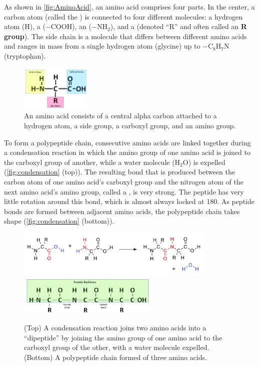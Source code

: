 As shown in \autoref{fig:AminoAcid}, an amino acid comprises four parts. In the center, a carbon atom (called the ) is connected to four different molecules: a hydrogen atom (H), a  ($-\text{COOH}$), an  ($-\text{NH}_2$), and a  (denoted ``R'' and often called an \textbf{R group}). The side chain is a molecule that differs between different amino acids and ranges in mass from a single hydrogen atom (glycine) up to $-\text{C}_8\text{H}_7\text{N}$ (tryptophan).

\begin{figure}[h]
	\centering
	\mySfFamily
	\includegraphics[width = 0.3\textwidth]{../images_CMYK/AminoAcid}
	\caption{An amino acid consists of a central alpha carbon attached to a hydrogen atom, a side group, a carboxyl group, and an amino group.}
	\label{fig:AminoAcid}
\end{figure}

To form a polypeptide chain, consecutive amino acids are linked together during a condensation reaction in which the amino group of one amino acid is joined to the carboxyl group of another, while a water molecule ($\text{H}_2\text{O}$) is expelled (\autoref{fig:condensation} (top)). The resulting bond that is produced between the carbon atom of one amino acid's carboxyl group and the nitrogen atom of the next amino acid's amino group, called a , is very strong. The peptide has very little rotation around this bond, which is almost always locked at 180\textdegree. As peptide bonds are formed between adjacent amino acids, the polypeptide chain takes shape (\autoref{fig:condensation} (bottom)).

\begin{figure}[h]
	\centering
	\mySfFamily
	\includegraphics[width = 0.85\textwidth]{../images_CMYK/dipeptide_reaction}\\[0.5ex]
	\includegraphics[width = 0.6\textwidth]{../images_CMYK/Backbone}
	\caption{(Top) A condensation reaction joins two amino acids into a ``dipeptide'' by joining the amino group of one amino acid to the carboxyl group of the other, with a water molecule expelled. (Bottom) A polypeptide chain formed of three amino acids.}
	\label{fig:condensation}
\end{figure}


